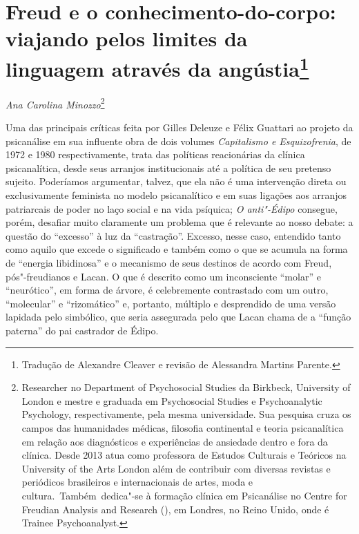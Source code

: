 \chapter*{Freud e o conhecimento-do-corpo: viajando pelos limites da
linguagem através da angústia\footnote{Tradução de Alexandre Cleaver e revisão
  de Alessandra Martins Parente.}}

\begin{flushright}
\emph{Ana Carolina Minozzo}\footnote{ Researcher no Department of Psychosocial
Studies da Birkbeck, University of London e mestre e graduada em Psychosocial
Studies e Psychoanalytic Psychology, respectivamente, pela mesma
universidade. Sua pesquisa cruza os campos das humanidades médicas, filosofia
continental e teoria psicanalítica em relação aos diagnósticos e experiências de
ansiedade dentro e fora da clínica. Desde 2013 atua como professora de Estudos
Culturais e Teóricos na University of the Arts London além de contribuir com
diversas revistas e periódicos brasileiros e internacionais de artes, moda e
cultura. Também dedica"-se à formação clínica em Psicanálise no Centre for
Freudian Analysis and Research (), em Londres, no Reino Unido, onde é
Trainee Psychoanalyst.}
\end{flushright}

Uma das principais críticas feita por Gilles Deleuze e Félix Guattari ao
projeto da psicanálise em sua influente obra de dois volumes
\emph{Capitalismo e Esquizofrenia}, de 1972 e 1980 respectivamente,
trata das políticas reacionárias da clínica psicanalítica, desde seus
arranjos institucionais até a política de seu pretenso sujeito.
Poderíamos argumentar, talvez, que ela não é uma intervenção direta ou
exclusivamente feminista no modelo psicanalítico e em suas ligações aos
arranjos patriarcais de poder no laço social e na vida psíquica;
\emph{O anti"-Édipo} consegue, porém, desafiar muito claramente um
problema que é relevante ao nosso debate: a questão do ``excesso'' à luz
da ``castração''. Excesso, nesse caso, entendido tanto como aquilo que
excede o significado e também como o que se acumula na forma de
``energia libidinosa'' e o mecanismo de seus destinos de acordo com
Freud, pós"-freudianos e Lacan. O que é descrito como um inconsciente
``molar'' e ``neurótico'', em forma de árvore, é celebremente
contrastado com um outro, ``molecular'' e ``rizomático'' e, portanto,
múltiplo e desprendido de uma versão lapidada pelo simbólico, que seria
assegurada pelo que Lacan chama de a ``função paterna'' do pai castrador
de Édipo.


